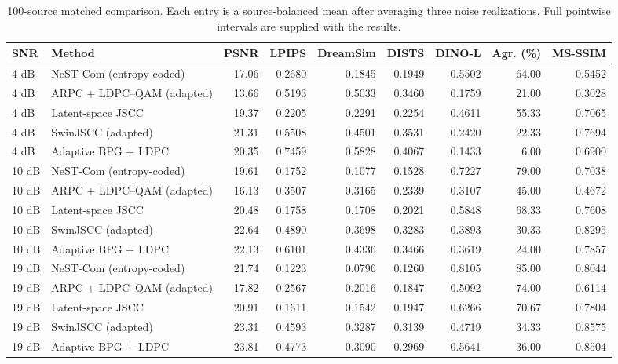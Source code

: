 \begin{table}[t]
\centering
\caption{100-source matched comparison. Each entry is a source-balanced mean after averaging three noise realizations. Full pointwise intervals are supplied with the results.}
\label{tab:arpc-matched100}
\begin{tabular}{llrrrrrrr}
\toprule
SNR & Method & PSNR & LPIPS & DreamSim & DISTS & DINO-L & Agr. (\%) & MS-SSIM \\
\midrule
4 dB & NeST-Com (entropy-coded) & 17.06 & 0.2680 & 0.1845 & 0.1949 & 0.5502 & 64.00 & 0.5452 \\
4 dB & ARPC + LDPC--QAM (adapted) & 13.66 & 0.5193 & 0.5033 & 0.3460 & 0.1759 & 21.00 & 0.3028 \\
4 dB & Latent-space JSCC & 19.37 & 0.2205 & 0.2291 & 0.2254 & 0.4611 & 55.33 & 0.7065 \\
4 dB & SwinJSCC (adapted) & 21.31 & 0.5508 & 0.4501 & 0.3531 & 0.2420 & 22.33 & 0.7694 \\
4 dB & Adaptive BPG + LDPC & 20.35 & 0.7459 & 0.5828 & 0.4067 & 0.1433 & 6.00 & 0.6900 \\
\midrule
10 dB & NeST-Com (entropy-coded) & 19.61 & 0.1752 & 0.1077 & 0.1528 & 0.7227 & 79.00 & 0.7038 \\
10 dB & ARPC + LDPC--QAM (adapted) & 16.13 & 0.3507 & 0.3165 & 0.2339 & 0.3107 & 45.00 & 0.4672 \\
10 dB & Latent-space JSCC & 20.48 & 0.1758 & 0.1708 & 0.2021 & 0.5848 & 68.33 & 0.7608 \\
10 dB & SwinJSCC (adapted) & 22.64 & 0.4890 & 0.3698 & 0.3283 & 0.3893 & 30.33 & 0.8295 \\
10 dB & Adaptive BPG + LDPC & 22.13 & 0.6101 & 0.4336 & 0.3466 & 0.3619 & 24.00 & 0.7857 \\
\midrule
19 dB & NeST-Com (entropy-coded) & 21.74 & 0.1223 & 0.0796 & 0.1260 & 0.8105 & 85.00 & 0.8044 \\
19 dB & ARPC + LDPC--QAM (adapted) & 17.82 & 0.2567 & 0.2016 & 0.1847 & 0.5092 & 74.00 & 0.6114 \\
19 dB & Latent-space JSCC & 20.91 & 0.1611 & 0.1542 & 0.1947 & 0.6266 & 70.67 & 0.7804 \\
19 dB & SwinJSCC (adapted) & 23.31 & 0.4593 & 0.3287 & 0.3139 & 0.4719 & 34.33 & 0.8575 \\
19 dB & Adaptive BPG + LDPC & 23.81 & 0.4773 & 0.3090 & 0.2969 & 0.5641 & 36.00 & 0.8504 \\
\bottomrule
\end{tabular}
\end{table}
